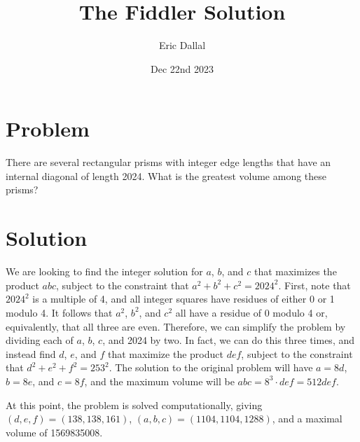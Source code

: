 \documentclass[10pt,a4paper]{article}
\title{The Fiddler Solution}
\date{Dec 22nd 2023}
\author{Eric Dallal}
\begin{document}
\maketitle
\section{Problem}
There are several rectangular prisms with integer edge lengths that have an internal diagonal of length 2024. What is the greatest volume among these prisms?

\section{Solution}
We are looking to find the integer solution for $a$, $b$, and $c$ that maximizes the product $abc$, subject to the constraint that $a^2 + b^2 + c^2 = 2024^2$. First, note that $2024^2$ is a multiple of 4, and all integer squares have residues of either 0 or 1 modulo 4. It follows that $a^2$, $b^2$, and $c^2$ all have a residue of 0 modulo 4 or, equivalently, that all three are even. Therefore, we can simplify the problem by dividing each of $a$, $b$, $c$, and 2024 by two. In fact, we can do this three times, and instead find $d$, $e$, and $f$ that maximize the product $def$, subject to the constraint that $d^2 + e^2 + f^2 = 253^2$. The solution to the original problem will have $a = 8d$, $b = 8e$, and $c = 8f$, and the maximum volume will be $abc = 8^3\cdot def = 512def$.

At this point, the problem is solved computationally, giving $(d, e, f) = (138, 138, 161)$, $(a, b, c) = (1104, 1104, 1288)$, and a maximal volume of 1569835008.
\end{document}
